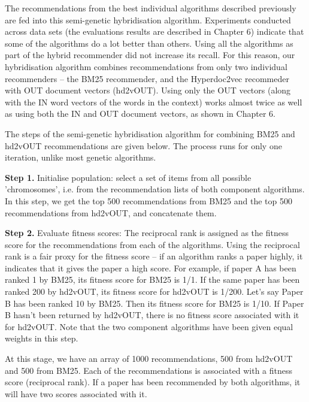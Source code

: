 The recommendations from the best individual algorithms described previously are fed into this semi-genetic hybridisation algorithm. Experiments conducted across data sets (the evaluations results are described in Chapter 6) indicate that some of the algorithms do a lot better than others. Using all the algorithms as part of the hybrid recommender did not increase its recall. For this reason, our hybridisation algorithm combines recommendations from only two individual recommenders -- the BM25 recommender, and the Hyperdoc2vec recommeder with OUT document vectors (hd2vOUT). Using only the OUT vectors (along with the IN word vectors of the words in the context) works almost twice as well as using both the IN and OUT document vectors, as shown in Chapter 6. 

The steps of the semi-genetic hybridisation algorithm for combining BM25 and hd2vOUT recommendations are given below. The process runs for only one iteration, unlike most genetic algorithms.

\textbf{Step 1.} Initialise population: select a set of items from all possible 'chromosomes', i.e. from the recommendation lists of both component algorithms. In this step, we get the top 500 recommendations from BM25 and the top 500 recommendations from hd2vOUT, and concatenate them.

\textbf{Step 2.} Evaluate fitness scores: The reciprocal rank is assigned as the fitness score for the recommendations from each of the algorithms. Using the reciprocal rank is a fair proxy for the fitness score -- if an algorithm ranks a paper highly, it indicates that it gives the paper a high score. For example, if paper A has been ranked 1 by BM25, its fitness score for BM25 is 1/1. If the same paper has been ranked 200 by hd2vOUT, its fitness score for hd2vOUT is 1/200. Let's say Paper B has been ranked 10 by BM25. Then its fitness score for BM25 is 1/10. If Paper B hasn't been returned by hd2vOUT, there is no fitness score associated with it for hd2vOUT. Note that the two component algorithms have been given equal weights in this step.

At this stage, we have an array of 1000 recommendations, 500 from hd2vOUT and 500 from BM25. Each of the recommendations is associated with a fitness score (reciprocal rank). If a paper has been recommended by both algorithms, it will have two scores associated with it.

